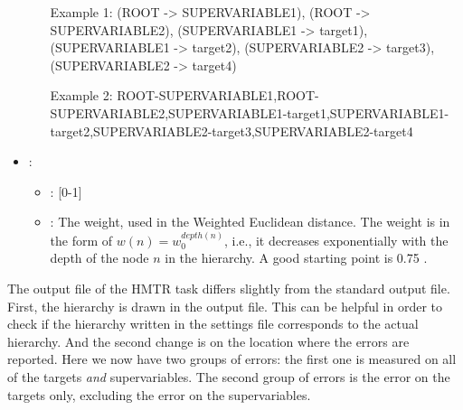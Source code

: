\begin{itemize}
\begin{itemize}
  \subitem \begin{sloppypar}Example 1: (ROOT { }-\textgreater{ } SUPERVARIABLE1), (ROOT { }-\textgreater{ } SUPERVARIABLE2), (SUPERVARIABLE1 { }-\textgreater{ } target1), (SUPERVARIABLE1 { }-\textgreater{ } target2), (SUPERVARIABLE2 { }-\textgreater{ } target3), (SUPERVARIABLE2 { }-\textgreater{ } target4)\end{sloppypar}
	\subitem \begin{sloppypar}Example 2: ROOT-SUPERVARIABLE1,ROOT-SUPERVARIABLE2,SUPERVARIABLE1-target1,SUPERVARIABLE1-target2,SUPERVARIABLE2-target3,SUPERVARIABLE2-target4\end{sloppypar}
           \end{itemize}
    \item {}:
           \begin{itemize}
                \item \optionPossibleValues{}: [0-1]
                \item \optionDescrption{}: The weight, used in the Weighted Euclidean distance. The weight is in the form of $w(n)=w_{0}^{depth(n)}$, i.e., it decreases exponentially with the depth of the node $n$ in the hierarchy. A good starting point is 0.75 \cite{Mileski2017:proc}.
           \end{itemize}
\end{itemize}

The output file of the HMTR task differs slightly from the standard output file. First, the hierarchy is drawn in the output file. This can be helpful in order to check if the hierarchy written in the settings file corresponds to the actual hierarchy. And the second change is on the location where the errors are reported. Here we now have two groups of errors: the first one is measured on all of the targets \textit{and} supervariables. The second group of errors is the error on the targets only, excluding the error on the supervariables.
